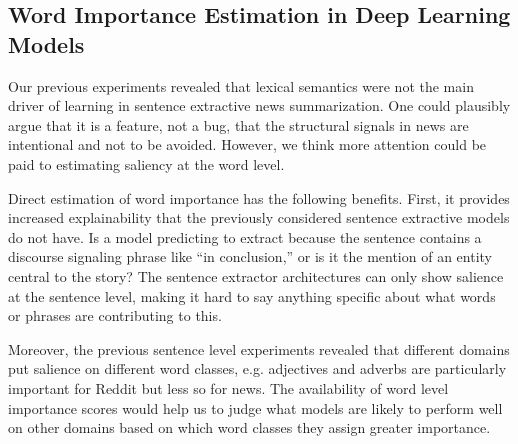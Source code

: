 \subsection{Word Importance Estimation in Deep Learning Models}







%

Our previous experiments revealed that lexical semantics were not the 
main driver of learning in sentence extractive news summarization. 
One could plausibly argue that it is a feature, not a bug, that 
the structural
signals in news are intentional and not to be avoided. However, we think more 
attention could be paid to estimating saliency at the word level.

Direct estimation of word importance has the following benefits.
First, it provides increased explainability that the previously
considered sentence extractive models do not have. 
Is a model predicting to extract because the sentence
contains a discourse signaling phrase like ``in conclusion,''
or is it the mention
of an entity central to the story?
The sentence extractor architectures
can only show salience at the sentence
level, making it hard to say anything specific about what
words or phrases are contributing to this. 

Moreover, the previous sentence level
experiments revealed that different domains put salience
on different word classes, e.g. adjectives and adverbs are particularly 
important for Reddit but less so for news. The availability of word level
importance scores would help us to judge what models are likely 
to perform well on other domains based on which word
classes they assign greater importance.

